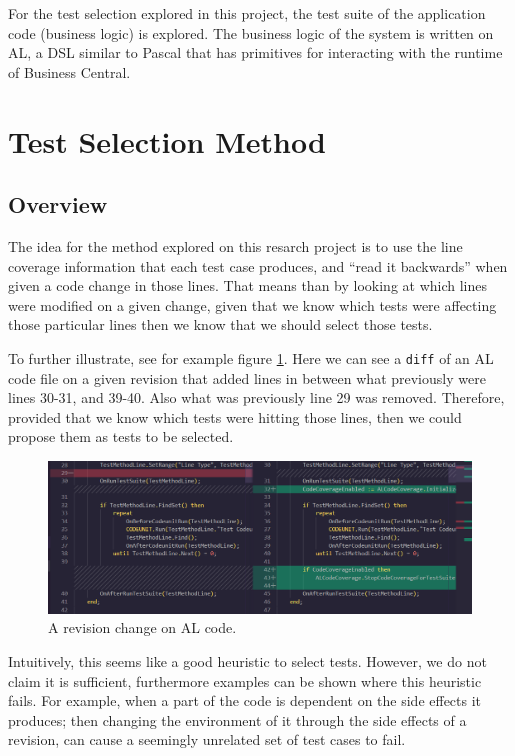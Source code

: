 \documentclass{article}
\begin{document}
   For the test selection explored in this project, the test suite of the application code (business logic) is explored. The business logic of the system is written on AL, a DSL similar to Pascal that has primitives for interacting with the runtime of Business Central.

\section{Test Selection Method}
\subsection{Overview}\label{section:overview}

The idea for the method explored on this resarch project is to use the line coverage information that each test case produces, and ``read it backwards'' when given a code change in those lines. That means than by looking at which lines were modified on a given change, given that we know which tests were affecting those particular lines then we know that we should select those tests.

To further illustrate, see for example figure \ref{fig:diff}. Here we can see a \texttt{diff} of an AL code file on a given revision that added lines in between what previously were lines 30-31, and 39-40. Also what was previously line 29 was removed. Therefore, provided that we know which tests were hitting those lines, then we could propose them as tests to be selected.

\begin{figure}[H]
  \includegraphics[width=\textwidth]{images/diff.png}
  \caption{A revision change on AL code.}
  \label{fig:diff}
\end{figure}

Intuitively, this seems like a good heuristic to select tests. However, we do not claim it is sufficient, furthermore examples can be shown where this heuristic fails. For example, when a part of the code is dependent on the side effects it produces; then changing the environment of it through the side effects of a revision, can cause a seemingly unrelated set of test cases to fail.
\end{document}

